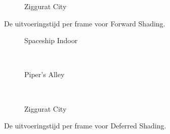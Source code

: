 \begin{figure}[t]
\begin{minipage}[t]{0.5\textwidth}
  \begin{adjustbox}{minipage=\textwidth, scale=0.55}
    \begin{subfigure}[b]{1.6\textwidth}
      \centering
      \def\svgwidth{\textwidth}
      
      \caption{Ziggurat City}
      \label{fig:hs-compare-frames:forward:city}
    \end{subfigure}
  \end{adjustbox}
  \caption{\small De uitvoeringstijd per frame voor Forward Shading.}
  \label{fig:hs-compare-frames:forward}
  \end{minipage}%
  \begin{minipage}[t]{0.5\textwidth}
  \begin{adjustbox}{minipage=\textwidth, scale=0.55}
    \begin{subfigure}[b]{1.6\textwidth}
      \centering
      \def\svgwidth{\textwidth}
      
      \caption{Spaceship Indoor}
      \vspace{4pt}
      \label{fig:hs-compare-frames:deferred:indoor}
    \end{subfigure}
  \end{adjustbox} \\
  \begin{adjustbox}{minipage=\textwidth, scale=0.55}
    \begin{subfigure}[b]{1.6\textwidth}
      \centering
      \def\svgwidth{\textwidth}
      
      \caption{Piper's Alley}
      \vspace{4pt}
      \label{fig:hs-compare-frames:deferred:alley}
    \end{subfigure}
  \end{adjustbox} \\
  \begin{adjustbox}{minipage=\textwidth, scale=0.55}
    \begin{subfigure}[b]{1.6\textwidth}
      \centering
      \def\svgwidth{\textwidth}
      
      \caption{Ziggurat City}
      \label{fig:hs-compare-frames:deferred:city}
    \end{subfigure}
  \end{adjustbox}
  \caption{\small De uitvoeringstijd per frame voor Deferred Shading.}
  \label{fig:hs-compare-frames:deferred}
  \end{minipage} 
\end{figure}
